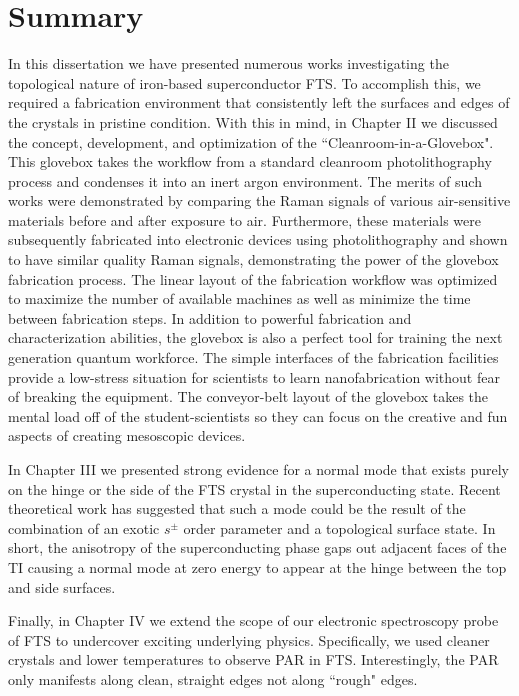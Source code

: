 \section{Summary}
In this dissertation we have presented numerous works investigating the topological nature of iron-based superconductor \acl{FTS}. To accomplish this, we required a fabrication environment that consistently left the surfaces and edges of the crystals in pristine condition. With this in mind, in Chapter II we discussed the concept, development, and optimization of the ``Cleanroom-in-a-Glovebox". This glovebox takes the workflow from a standard cleanroom photolithography process and condenses it into an inert argon environment. The merits of such works were demonstrated by comparing the Raman signals of various air-sensitive materials before and after exposure to air. Furthermore, these materials were subsequently fabricated into electronic devices using photolithography and shown to have similar quality Raman signals, demonstrating the power of the glovebox fabrication process. The linear layout of the fabrication workflow was optimized to maximize the number of available machines as well as minimize the time between fabrication steps. In addition to powerful fabrication and characterization abilities, the glovebox is also a perfect tool for training the next generation quantum workforce. The simple interfaces of the fabrication facilities provide a low-stress situation for scientists to learn nanofabrication without fear of breaking the equipment. The conveyor-belt layout of the glovebox takes the mental load off of the student-scientists so they can focus on the creative and fun aspects of creating mesoscopic devices.\par
In Chapter III we presented strong evidence for a normal mode that exists purely on the hinge or the side of the \ac{FTS} crystal in the superconducting state. Recent theoretical work has suggested that such a mode could be the result of the combination of an exotic $s^{\pm}$ order parameter and a topological surface state. In short, the anisotropy of the superconducting phase gaps out adjacent faces of the \ac{TI} causing a normal mode at zero energy to appear at the hinge between the top and side surfaces. 
\par
Finally, in Chapter IV we extend the scope of our electronic spectroscopy probe of \ac{FTS} to undercover exciting underlying physics. Specifically, we used cleaner crystals and lower temperatures to observe \acl{PAR} in \ac{FTS}. Interestingly, the \ac{PAR} only manifests along clean, straight edges not along ``rough" edges. 

